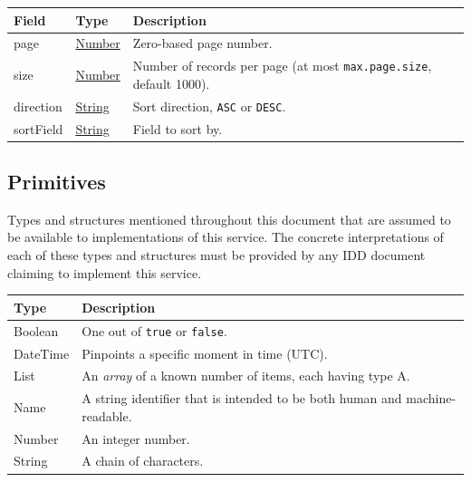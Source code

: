 \documentclass[a4paper]{arrowhead}
\newcommand{\pdef}[1]{{\textcolor{ArrowheadGrey}{#1\label{sec:model:primitives:#1}\label{sec:model:primitives:#1s}\label{sec:model:primitives:#1es}}}}
\newcommand{\pref}[1]{{\textcolor{ArrowheadGrey}{\hyperref[sec:model:primitives:#1]{#1}}}}
\begin{document}
\noindent\begin{tabularx}{\textwidth}{| >{\raggedright\arraybackslash}p{3.9cm} | >{\raggedright\arraybackslash\small}p{5.3cm} | X |} \hline
\rowcolor{gray!33} Field & Type & Description \\ \hline
page & \pref{Number} & Zero-based page number. \\ \hline
size & \pref{Number} & Number of records per page (at most \texttt{max.\allowbreak{}page.\allowbreak{}size}, default 1000). \\ \hline
direction & \pref{String} & Sort direction, \texttt{ASC} or \texttt{DESC}. \\ \hline
sort\allowbreak{}Field & \pref{String} & Field to sort by. \\ \hline
\end{tabularx}



\subsection{Primitives}
\label{sec:model:primitives}

Types and structures mentioned throughout this document that are assumed to be available to implementations of this service.
The concrete interpretations of each of these types and structures must be provided by any IDD document claiming to implement this service.

\noindent\begin{tabularx}{\textwidth}{| p{4.6cm} | X |} \hline
\rowcolor{gray!33} Type & Description \\ \hline
\pdef{Boolean} & One out of \texttt{true} or \texttt{false}. \\ \hline
\pdef{DateTime} & Pinpoints a specific moment in time (UTC). \\ \hline
\pdef{List} & An \textit{array} of a known number of items, each having type A. \\ \hline
\pdef{Name} & A string identifier that is intended to be both human and machine-readable. \\ \hline
\pdef{Number} & An integer number. \\ \hline
\pdef{String} & A chain of characters. \\ \hline
\end{tabularx}

\newpage




\newpage
\end{document}
